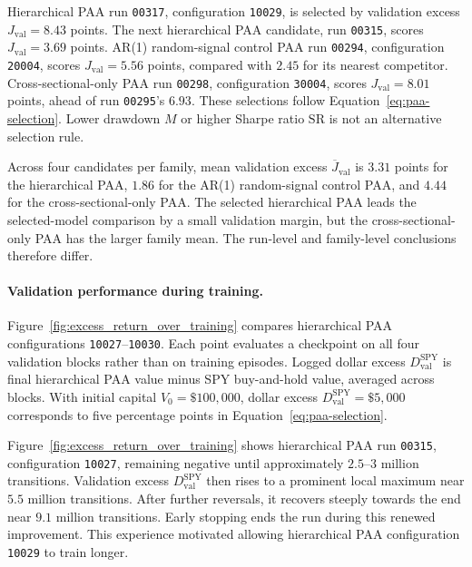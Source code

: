Hierarchical PAA run \texttt{00317}, configuration \texttt{10029}, is selected by validation excess \(J_{\mathrm{val}}=8.43\) points. The next hierarchical PAA candidate, run \texttt{00315}, scores \(J_{\mathrm{val}}=3.69\) points. AR(1) random-signal control PAA run \texttt{00294}, configuration \texttt{20004}, scores \(J_{\mathrm{val}}=5.56\) points, compared with \(2.45\) for its nearest competitor. Cross-sectional-only PAA run \texttt{00298}, configuration \texttt{30004}, scores \(J_{\mathrm{val}}=8.01\) points, ahead of run \texttt{00295}'s \(6.93\). These selections follow Equation~\eqref{eq:paa-selection}. Lower drawdown \(M\) or higher Sharpe ratio \(\mathrm{SR}\) is not an alternative selection rule.

Across four candidates per family, mean validation excess \(\overline J_{\mathrm{val}}\) is \(3.31\) points for the hierarchical PAA, \(1.86\) for the AR(1) random-signal control PAA, and \(4.44\) for the cross-sectional-only PAA. The selected hierarchical PAA leads the selected-model comparison by a small validation margin, but the cross-sectional-only PAA has the larger family mean. The run-level and family-level conclusions therefore differ.

\paragraph{Validation performance during training.}
Figure~\ref{fig:excess_return_over_training} compares hierarchical PAA configurations \texttt{10027}--\texttt{10030}. Each point evaluates a checkpoint on all four validation blocks rather than on training episodes. Logged dollar excess \(D_{\mathrm{val}}^{\mathrm{SPY}}\) is final hierarchical PAA value minus SPY buy-and-hold value, averaged across blocks. With initial capital \(V_0=\$100{,}000\), dollar excess \(D_{\mathrm{val}}^{\mathrm{SPY}}=\$5{,}000\) corresponds to five percentage points in Equation~\eqref{eq:paa-selection}.

Figure~\ref{fig:excess_return_over_training} shows hierarchical PAA run \texttt{00315}, configuration \texttt{10027}, remaining negative until approximately \(2.5\)--\(3\) million transitions. Validation excess \(D_{\mathrm{val}}^{\mathrm{SPY}}\) then rises to a prominent local maximum near \(5.5\) million transitions. After further reversals, it recovers steeply towards the end near \(9.1\) million transitions. Early stopping ends the run during this renewed improvement. This experience motivated allowing hierarchical PAA configuration \texttt{10029} to train longer.

